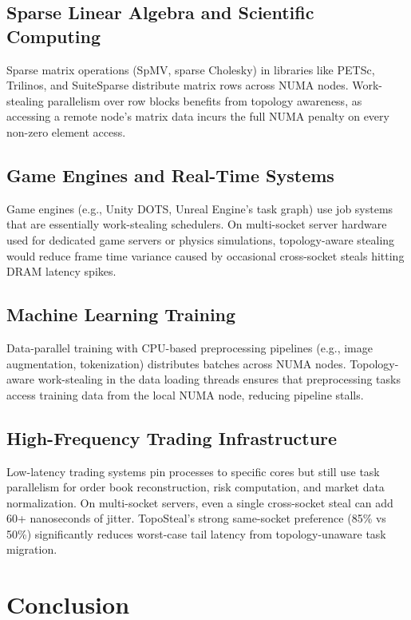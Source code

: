 \documentclass[conference]{IEEEtran}
\begin{document}
\subsection{Sparse Linear Algebra and Scientific Computing}

Sparse matrix operations (SpMV, sparse Cholesky) in libraries like PETSc, Trilinos, and SuiteSparse distribute matrix rows across NUMA nodes. Work-stealing parallelism over row blocks benefits from topology awareness, as accessing a remote node's matrix data incurs the full NUMA penalty on every non-zero element access.

\subsection{Game Engines and Real-Time Systems}

Game engines (e.g., Unity DOTS, Unreal Engine's task graph) use job systems that are essentially work-stealing schedulers. On multi-socket server hardware used for dedicated game servers or physics simulations, topology-aware stealing would reduce frame time variance caused by occasional cross-socket steals hitting DRAM latency spikes.

\subsection{Machine Learning Training}

Data-parallel training with CPU-based preprocessing pipelines (e.g., image augmentation, tokenization) distributes batches across NUMA nodes. Topology-aware work-stealing in the data loading threads ensures that preprocessing tasks access training data from the local NUMA node, reducing pipeline stalls.

\subsection{High-Frequency Trading Infrastructure}

Low-latency trading systems pin processes to specific cores but still use task parallelism for order book reconstruction, risk computation, and market data normalization. On multi-socket servers, even a single cross-socket steal can add 60+ nanoseconds of jitter. TopoSteal's strong same-socket preference (85\% vs 50\%) significantly reduces worst-case tail latency from topology-unaware task migration.

\section{Conclusion}
\end{document}
